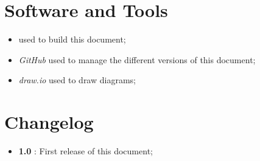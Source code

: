 \section{Software and Tools}
\begin{itemize}
  \item \text{\LaTeX} used to build this document;
  \item \textit{GitHub} used to manage the different versions of this document;
  \item \textit{draw.io} used to draw diagrams;
\end{itemize}


\section{Changelog}
\begin{itemize}
  \item \textbf{1.0} : First release of this document;
\end{itemize}
